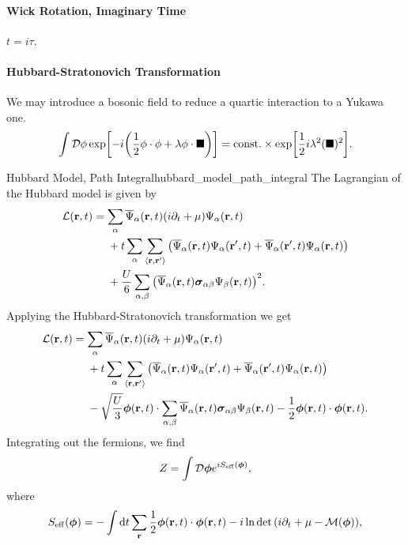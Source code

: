 \documentclass{article}
\begin{document}
\paragraph*{Wick Rotation, Imaginary Time}
$t = i\tau$.

\paragraph*{Hubbard-Stratonovich Transformation}
We may introduce a bosonic field to reduce a quartic interaction to a Yukawa one.
\[ \int \mathcal{D}\vb{\phi} \exp[-i\qty(\frac{1}{2}\vb{\phi}\cdot \vb{\phi} + \lambda \vb{\phi}\cdot \blacksquare)] = \mathrm{const.} \times \exp[\frac{1}{2}i\lambda^2 (\blacksquare)^2]. \]

\begin{example}{Hubbard Model, Path Integral}{hubbard_model_path_integral}
    The Lagrangian of the Hubbard model is given by
    \begin{align*}
        \mathcal{L}(\vb{r},t) &= \sum_\alpha \overline{\Psi}_\alpha(\vb{r},t) (i\partial_t + \mu) \Psi_\alpha(\vb{r},t) \\
        &\phantom{{}={}} + t \sum_\alpha \sum_{\langle \vb{r},\vb{r}' \rangle} \qty(\overline{\Psi}_\alpha(\vb{r},t) \Psi_\alpha(\vb{r}',t)+\overline{\Psi}_\alpha(\vb{r}',t) \Psi_\alpha(\vb{r},t)) \\
        &\phantom{{}={}} +\frac{U}{6} \sum_{\alpha,\beta} \qty(\overline{\Psi}_\alpha(\vb{r},t) \vb*{\sigma}_{\alpha\beta}\Psi_\beta(\vb{r},t))^2.
    \end{align*}
    Applying the Hubbard-Stratonovich transformation we get
    \begin{align*}
        \mathcal{L}(\vb{r},t) &= \sum_\alpha \overline{\Psi}_\alpha(\vb{r},t) (i\partial_t + \mu) \Psi_\alpha(\vb{r},t) \\
        &\phantom{{}={}} + t \sum_\alpha \sum_{\langle \vb{r},\vb{r}' \rangle} \qty(\overline{\Psi}_\alpha(\vb{r},t) \Psi_\alpha(\vb{r}',t)+\overline{\Psi}_\alpha(\vb{r}',t) \Psi_\alpha(\vb{r},t)) \\
        &\phantom{{}={}} - \sqrt{\frac{U}{3}} \vb*{\phi}(\vb{r},t) \cdot \sum_{\alpha,\beta}\overline{\Psi}_\alpha(\vb{r},t) \vb*{\sigma}_{\alpha\beta} \Psi_\beta(\vb{r},t) - \frac{1}{2}\vb*{\phi}(\vb{r},t) \cdot \vb*{\phi}(\vb{r},t).
    \end{align*}
    Integrating out the fermions, we find
    \[ Z = \int \mathcal{D}\vb*{\phi} e^{iS_{\mathrm{eff}}(\vb*{\phi})}, \]
    where
    \[ S_{\mathrm{eff}}(\vb*{\phi}) = -\int \dd{t} \sum_{\vb{r}} \frac{1}{2}\vb*{\phi}(\vb{r},t)\cdot \vb*{\phi}(\vb{r},t) - i\ln\det\qty(i\partial_t + \mu - \mathcal{M}(\vb*{\phi})), \]

\end{example}
\end{document}
